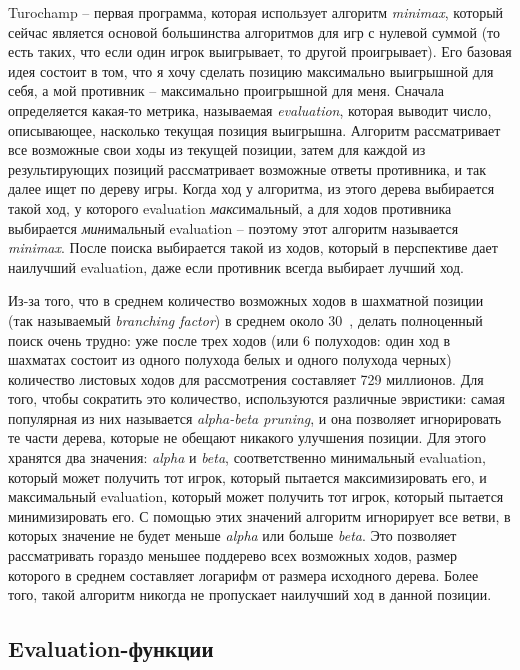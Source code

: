 \documentclass{article}
\begin{document}
Turochamp -- первая программа, которая использует алгоритм \emph{minimax},
который сейчас является основой большинства алгоритмов для игр с нулевой суммой
(то есть таких, что если один игрок выигрывает, то другой проигрывает).
Его базовая идея состоит в том,
что я хочу сделать позицию максимально выигрышной для себя,
а мой противник -- максимально проигрышной для меня.
Сначала определяется какая-то метрика, называемая \emph{evaluation},
которая выводит число, описывающее, насколько текущая позиция выигрышна.
Алгоритм рассматривает все возможные свои ходы из текущей позиции,
затем для каждой из результирующих позиций рассматривает возможные ответы противника,
и так далее ищет по дереву игры.
Когда ход у алгоритма, из этого дерева выбирается такой ход,
у которого evaluation \emph{макс}имальный,
а для ходов противника выбирается \emph{мин}имальный evaluation --
поэтому этот алгоритм называется \emph{minimax}.
После поиска выбирается такой из ходов,
который в перспективе дает наилучший evaluation,
даже если противник всегда выбирает лучший ход.

Из-за того, что в среднем количество возможных ходов в шахматной позиции
(так называемый \emph{branching factor})
в среднем около 30~\cite{chess-se-branching-factor},
делать полноценный поиск очень трудно:
уже после трех ходов (или 6 полуходов: один ход в шахматах состоит из одного полухода белых и одного полухода черных)
количество листовых ходов для рассмотрения составляет 729 миллионов.
Для того, чтобы сократить это количество,
используются различные эвристики: самая популярная из них называется \emph{alpha-beta pruning},
и она позволяет игнорировать те части дерева, которые не обещают никакого улучшения позиции.
Для этого хранятся два значения: \emph{alpha} и \emph{beta},
соответственно минимальный evaluation, который может получить тот игрок, который пытается максимизировать его,
и максимальный evaluation, который может получить тот игрок, который пытается минимизировать его.
С помощью этих значений алгоритм игнорирует все ветви,
в которых значение не будет меньше \emph{alpha} или больше \emph{beta}.
Это позволяет рассматривать гораздо меньшее поддерево всех возможных ходов,
размер которого в среднем составляет логарифм от размера исходного дерева.
Более того, такой алгоритм никогда не пропускает наилучший ход в данной позиции.

\subsection{Evaluation-функции}
\end{document}
